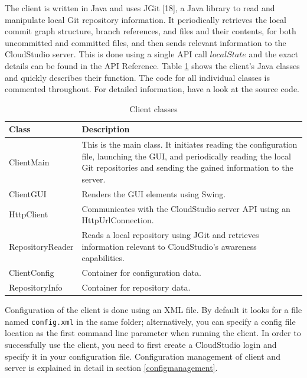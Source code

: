 The client is written in Java and uses JGit [18], a Java library to read and manipulate local Git repository information. It periodically retrieves the local commit graph structure, branch references, and files and their contents, for both uncommitted and committed files, and then sends relevant information to the CloudStudio server. This is done using a single API call $localState$ and the exact details can be found in the API Reference. Table \ref{table:clientclasses} shows the client's Java classes and quickly describes their function. The code for all individual classes is commented throughout. For detailed information, have a look at the source code. \\




\begin{table}

    \scriptsize
    \begin{tabularx}{\textwidth}{ | l | X | }
    \hline
\textbf{Class} & \textbf{Description} \\ \hline
ClientMain & This is the main class. It initiates reading the configuration file, launching the GUI, and periodically reading the local Git repositories and sending the gained information to the server. \\ \hline
ClientGUI & Renders the GUI elements using Swing. \\ \hline
HttpClient & Communicates with the CloudStudio server API using an HttpUrlConnection. \\ \hline
RepositoryReader & Reads a local repository using JGit and retrieves information relevant to CloudStudio's awareness capabilities. \\ \hline
ClientConfig & Container for configuration data. \\ \hline
RepositoryInfo & Container for repository data. \\ \hline
    \end{tabularx}
    
    \centering
  \caption{Client classes}
  \label{table:clientclasses}
\end{table}


Configuration of the client is done using an XML file. By default it looks for a file named \texttt{config.xml} in the same folder; alternatively, you can specify a config file location as the first command line parameter when running the client. In order to successfully use the client, you need to first create a CloudStudio login and specify it in your configuration file. Configuration management of client and server is explained in detail in section \ref{configmanagement}. \\

